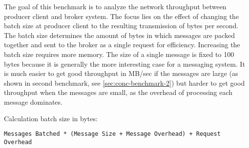 The goal of this benchmark is to analyze the network throughput between producer
client and broker system.  The focus lies on the effect of changing the batch
size at producer client to the resulting transmission of bytes per second. The
batch size determines the amount of bytes in which messages are packed
together and sent to the broker as a single request for efficiency. Increasing the
batch size requires more memory. The size of a single message is fixed to 100
bytes because it is generally the more interesting case for a messaging system. It is much easier to get good throughput in MB/sec if the messages are
large (as shown in second benchmark, see \ref{sec:conc-benchmark-2}) but
harder to get good throughput when the messages are small, as the overhead of
processing each message dominates.

Calculation batch size in bytes:
\begin{verbatim}
Messages Batched * (Message Size + Message Overhead) + Request Overhead 
\end{verbatim}


